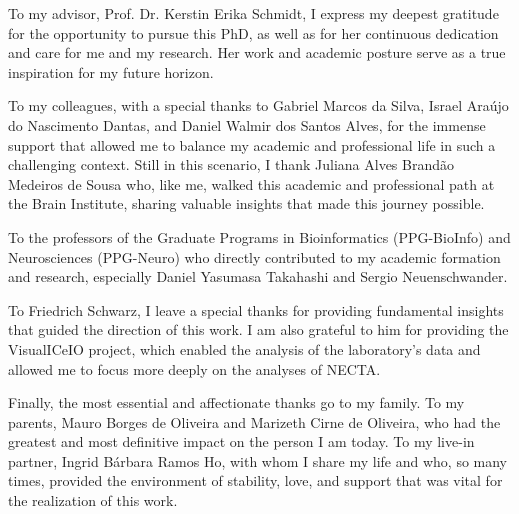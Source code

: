 \begin{agradecimentos}
To my advisor, Prof. Dr. Kerstin Erika Schmidt, I express my deepest gratitude for the opportunity to pursue this PhD, as well as for her continuous dedication and care for me and my research. Her work and academic posture serve as a true inspiration for my future horizon.

To my colleagues, with a special thanks to Gabriel Marcos da Silva, Israel Araújo do Nascimento Dantas, and Daniel Walmir dos Santos Alves, for the immense support that allowed me to balance my academic and professional life in such a challenging context. Still in this scenario, I thank Juliana Alves Brandão Medeiros de Sousa who, like me, walked this academic and professional path at the Brain Institute, sharing valuable insights that made this journey possible.

To the professors of the Graduate Programs in Bioinformatics (PPG-BioInfo) and Neurosciences (PPG-Neuro) who directly contributed to my academic formation and research, especially Daniel Yasumasa Takahashi and Sergio Neuenschwander.

To Friedrich Schwarz, I leave a special thanks for providing fundamental insights that guided the direction of this work. I am also grateful to him for providing the VisualICeIO project, which enabled the analysis of the laboratory's data and allowed me to focus more deeply on the analyses of NECTA.

Finally, the most essential and affectionate thanks go to my family. To my parents, Mauro Borges de Oliveira and Marizeth Cirne de Oliveira, who had the greatest and most definitive impact on the person I am today. To my live-in partner, Ingrid Bárbara Ramos Ho, with whom I share my life and who, so many times, provided the environment of stability, love, and support that was vital for the realization of this work.
\end{agradecimentos}